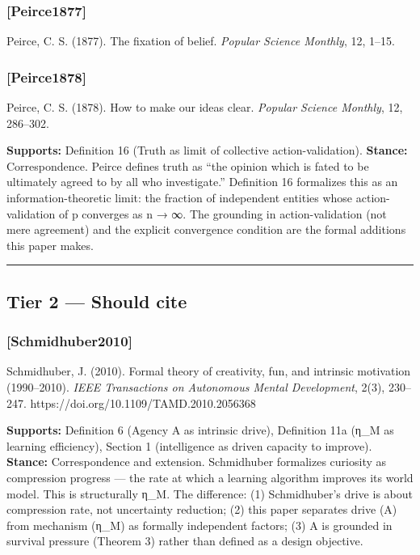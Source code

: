\documentclass[
]{article}
\begin{document}
\subsubsection{{[}Peirce1877{]}}\label{peirce1877}

Peirce, C. S. (1877). The fixation of belief. \emph{Popular Science
Monthly}, 12, 1--15.

\subsubsection{{[}Peirce1878{]}}\label{peirce1878}

Peirce, C. S. (1878). How to make our ideas clear. \emph{Popular Science
Monthly}, 12, 286--302.

\textbf{Supports:} Definition 16 (Truth as limit of collective
action-validation). \textbf{Stance:} Correspondence. Peirce defines
truth as ``the opinion which is fated to be ultimately agreed to by all
who investigate.'' Definition 16 formalizes this as an
information-theoretic limit: the fraction of independent entities whose
action-validation of p converges as n → ∞. The grounding in
action-validation (not mere agreement) and the explicit convergence
condition are the formal additions this paper makes.

\begin{center}\rule{0.5\linewidth}{0.5pt}\end{center}

\subsection{Tier 2 --- Should cite}\label{tier-2-should-cite}

\subsubsection{{[}Schmidhuber2010{]}}\label{schmidhuber2010}

Schmidhuber, J. (2010). Formal theory of creativity, fun, and intrinsic
motivation (1990--2010). \emph{IEEE Transactions on Autonomous Mental
Development}, 2(3), 230--247. https://doi.org/10.1109/TAMD.2010.2056368

\textbf{Supports:} Definition 6 (Agency A as intrinsic drive),
Definition 11a (η\_M as learning efficiency), Section 1 (intelligence as
driven capacity to improve). \textbf{Stance:} Correspondence and
extension. Schmidhuber formalizes curiosity as compression progress ---
the rate at which a learning algorithm improves its world model. This is
structurally η\_M. The difference: (1) Schmidhuber's drive is about
compression rate, not uncertainty reduction; (2) this paper separates
drive (A) from mechanism (η\_M) as formally independent factors; (3) A
is grounded in survival pressure (Theorem 3) rather than defined as a
design objective.
\end{document}

